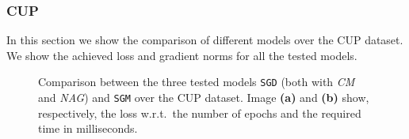 \subsubsection{CUP}
In this section we show the comparison of different models over the CUP dataset. We show the achieved loss and gradient norms for all the tested models.
\begin{figure}[H]
	\centering
	\begin{subfigure}{.4\textwidth}
	    \centering
	\end{subfigure}
	\begin{subfigure}{.4\textwidth}
	    \centering
	\end{subfigure}
    
	\caption{Comparison between the three tested models \texttt{SGD} (both with \textit{CM} and \textit{NAG}) and \texttt{SGM} over the CUP dataset. Image \textbf{(a)} and \textbf{(b)} show, respectively, the loss w.r.t.\ the number of epochs and the required time in milliseconds.}
	\label{fig:cup_loss}
\end{figure}

